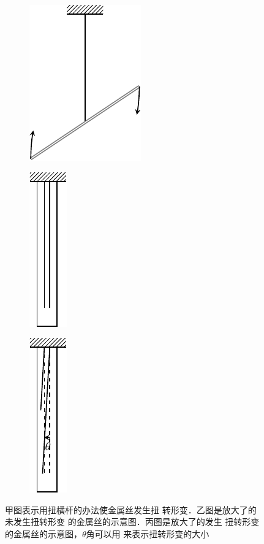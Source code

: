 \begin{figure}[htbp]
    \centering
    \begin{subfigure} {0.32\linewidth} 
        \centering
        \includegraphics{fig/A/1-11a.pdf} 
        \caption{}\label{fig_A_1-11a} 
    \end{subfigure} 
    \hfil
    \begin{subfigure} {0.32\linewidth} 
        \centering
        \includegraphics{fig/A/1-11b.pdf} 
        \caption{}\label{fig_A_1-11b} 
    \end{subfigure} 
    \hfil
    \begin{subfigure} {0.32\linewidth} 
        \centering
        \includegraphics{fig/A/1-11c.pdf} 
        \caption{}\label{fig_A_1-11c} 
    \end{subfigure} 
    \caption{甲图表示用扭横杆的办法使金属丝发生扭
    转形变．乙图是放大了的未发生扭转形变
    的金属丝的示意图．丙图是放大了的发生
    扭转形变的金属丝的示意图，$\theta$角可以用
    来表示扭转形变的大小} \label{fig_A_1-11} 
\end{figure} 



